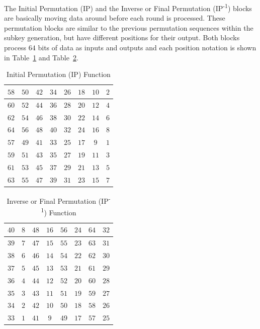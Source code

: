 \documentclass{article}
\begin{document}
The Initial Permutation (IP) and the Inverse or Final
Permutation (IP\textsuperscript{-1}) blocks are basically moving data
around before each round is processed.  These permutation blocks are
similar to the previous permutation sequences within the subkey
generation, but have different positions for their output.  Both
blocks process $64$ bits of data as inputs and outputs and each
position notation is shown in Table~\ref{ip.tbl} and
Table~\ref{ip2.tbl}. 
\begin{table}
  \centering
  \begin{tabular} {|c|c|c|c|c|c|c|c|} \hline
    $58$ & $50$ & $42$ & $34$ & $26$ & $18$ & $10$ & $2$ \\ \hline
    $60$ & $52$ & $44$ & $36$ & $28$ & $20$ & $12$ & $4$ \\ \hline
    $62$ & $54$ & $46$ & $38$ & $30$ & $22$ & $14$ & $6$ \\ \hline
    $64$ & $56$ & $48$ & $40$ & $32$ & $24$ & $16$ & $8$ \\ \hline
    $57$ & $49$ & $41$ & $33$ & $25$ & $17$ & $9$  & $1$ \\ \hline
    $59$ & $51$ & $43$ & $35$ & $27$ & $19$ & $11$ & $3$ \\ \hline
    $61$ & $53$ & $45$ & $37$ & $29$ & $21$ & $13$ & $5$ \\ \hline
    $63$ & $55$ & $47$ & $39$ & $31$ & $23$ & $15$ & $7$ \\ \hline
\end{tabular}
\caption{Initial Permutation (IP) Function}
\label{ip.tbl}
\end{table}
\begin{table}
  \centering
  \begin{tabular} {|c|c|c|c|c|c|c|c|} \hline
    $40$ & $8$ & $48$ & $16$ & $56$ & $24$ & $64$ & $32$ \\ \hline
    $39$ & $7$ & $47$ & $15$ & $55$ & $23$ & $63$ & $31$ \\ \hline
    $38$ & $6$ & $46$ & $14$ & $54$ & $22$ & $62$ & $30$ \\ \hline
    $37$ & $5$ & $45$ & $13$ & $53$ & $21$ & $61$ & $29$ \\ \hline
    $36$ & $4$ & $44$ & $12$ & $52$ & $20$ & $60$ & $28$ \\ \hline
    $35$ & $3$ & $43$ & $11$ & $51$ & $19$ & $59$ & $27$ \\ \hline
    $34$ & $2$ & $42$ & $10$ & $50$ & $18$ & $58$ & $26$ \\ \hline
    $33$ & $1$ & $41$ & $9$  & $49$ & $17$ & $57$ & $25$ \\ \hline
\end{tabular}
\caption{Inverse or Final Permutation (IP\textsuperscript{-1}) Function}
\label{ip2.tbl}
\end{table}
\end{document}
